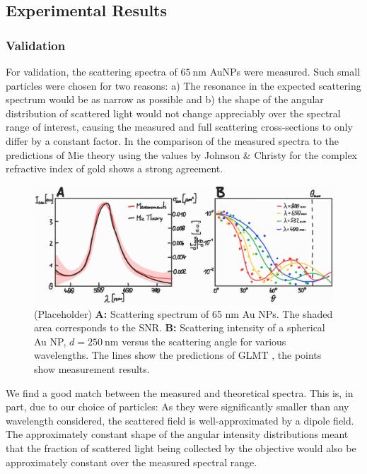 \documentclass[10pt]{article}
\begin{document}
\subsection*{Experimental Results}

\subsubsection*{Validation}



For validation, the scattering spectra of $\SI{65}{\nano\meter}$ AuNPs were measured. 
Such small particles were chosen for two reasons: 
a) The resonance in the expected scattering spectrum would be as narrow as possible and b) the shape of the angular distribution of scattered light would not change appreciably over the spectral range of interest, causing the measured and full scattering cross-sections to only differ by a constant factor. 
In the comparison of the measured spectra to the predictions of Mie theory \cite{Mie1908, BohrenHuffman, GouesbetGrehan} using the values by Johnson \& Christy \cite{Johnson1972} for the complex refractive index of gold shows a strong agreement. 

\begin{figure}[t]
    \centering
    \includegraphics[width=\textwidth]{[fig] AuNP (placeholder).jpg}
    \caption{(Placeholder) 
    {\sffamily\bfseries A:} Scattering spectrum of 65 nm Au NPs. The shaded area corresponds to the SNR. 
    {\sffamily\bfseries B:} Scattering intensity of a spherical Au NP, $d=\SI{250}{\nano\meter}$ versus the scattering angle for various wavelengths. The lines show the predictions of GLMT \cite{GouesbetGrehan}, the points show measurement results.
    }
    \label{fig:AuNP}
\end{figure}

We find a good match between the measured and theoretical spectra. 
This is, in part, due to our choice of particles: 
As they were significantly smaller than any wavelength considered, the scattered field is well-approximated by a dipole field. 
The approximately constant shape of the angular intensity distributions meant that the fraction of scattered light being collected by the objective would also be approximately constant over the measured spectral range.
\end{document}
